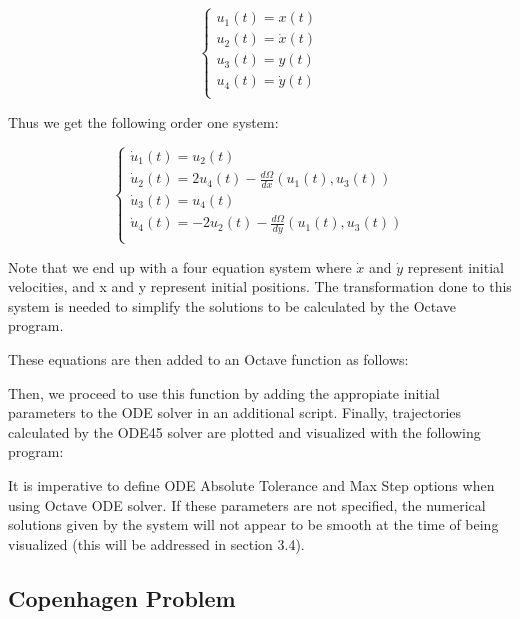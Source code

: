 \documentclass{article}
\begin{document}
\begin{equation}\label{transform2}
   \begin{cases}
    u_1(t) = x(t) \\
    u_2(t) = \dot{x}(t) \\
    u_3(t) = y(t) \\
    u_4(t) = \dot{y}(t) \\
  \end{cases}     
\end{equation}

Thus we get the following order one system:

\begin{equation}\label{transform3}
   \begin{cases}
    \dot{u}_1(t) = u_2(t) \\
    \dot{u}_2(t) = 2 u_4(t) - \frac{d \Omega}{dx} (u_1(t),u_3(t)) \\
    \dot{u}_3(t) = u_4(t) \\
    \dot{u}_4(t) = - 2 u_2(t) - \frac{d \Omega}{dy} (u_1(t),u_3(t)) \\
  \end{cases}     
\end{equation}

Note that we end up with a four equation system where $\dot{x}$ and $\dot{y}$ represent initial velocities, and x and y represent initial positions. The transformation done to this system is needed to simplify the solutions to be calculated by the Octave program.

\newpage

These equations are then added to an Octave function as follows:
 


Then, we proceed to use this function by adding the appropiate initial parameters to the ODE solver in an additional script. Finally, trajectories calculated by the ODE45 solver are plotted and visualized with the following program:



It is imperative to define ODE Absolute Tolerance and Max Step options when using Octave ODE solver. If these parameters are not specified, the numerical solutions given by the system will not appear to be smooth at the time of being visualized (this will be addressed in section 3.4).

\subsection{Copenhagen Problem}
\end{document}
